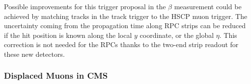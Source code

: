 Possible improvements for this trigger proposal in the $\beta$ measurement could be achieved by matching tracks in the track trigger to the HSCP muon trigger. The uncertainty coming from the propagation time along RPC strips can be reduced if the hit position is known along the local $y$ coordinate, or the global $\eta$. This correction is not needed for the RPCs thanks to the two-end strip readout for these new detectors.

\subsubsection{Displaced Muons in CMS}



